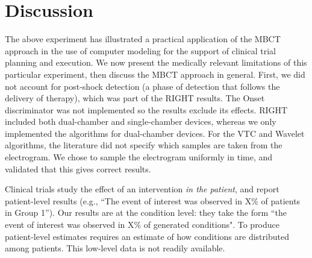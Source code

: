 \section{Discussion}
\label{sec:discussion}

The above experiment has illustrated a practical application of the MBCT approach in the use of computer modeling for the support of clinical trial planning and execution.
We now present the medically relevant limitations of this particular experiment, then discuss the MBCT approach in general.
First, we did not account for post-shock detection (a phase of detection that follows the delivery of therapy), which was part of the RIGHT results.
The Onset discriminator was not implemented so the results exclude its effects.
RIGHT included both dual-chamber and single-chamber devices, whereas we only implemented the algorithms for dual-chamber devices.
For the VTC and Wavelet algorithms, the literature did not specify which samples are taken from the electrogram. 
We chose to sample the electrogram uniformly in time, and validated that this gives correct results.

Clinical trials study the effect of an intervention \emph{in the patient}, and report patient-level results (e.g., ``The event of interest was observed in X\% of patients in Group 1''). 
Our results are at the condition level: they take the form ``the event of interest was observed in X\% of generated conditions".
To produce patient-level estimates requires an estimate of how conditions are distributed among patients. 
This low-level data is not readily available.

